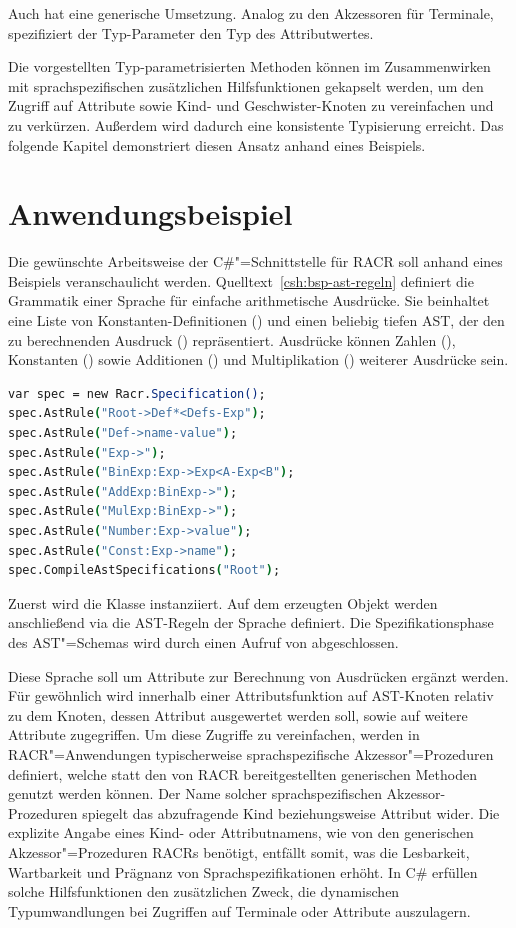 Auch  hat eine generische Umsetzung. Analog zu den Akzessoren für Terminale, spezifiziert der Typ-Parameter den Typ des Attributwertes.

Die vorgestellten Typ-parametrisierten Methoden können im Zusammenwirken mit sprachspezifischen zusätzlichen Hilfsfunktionen gekapselt werden, um den Zugriff auf Attribute sowie Kind- und Geschwister-Knoten zu vereinfachen und zu verkürzen. Außerdem wird dadurch eine konsistente Typisierung erreicht. Das folgende Kapitel demonstriert diesen Ansatz anhand eines Beispiels.

\section{Anwendungsbeispiel}\label{anwendungsbeispiel}

Die gewünschte Arbeitsweise der C\#"=Schnittstelle für RACR soll anhand eines Beispiels veranschaulicht werden. Quelltext~\ref{csh:bsp-ast-regeln} definiert die Grammatik einer Sprache für einfache arithmetische Ausdrücke. Sie beinhaltet eine Liste von Konstanten-Definitionen () und einen beliebig tiefen AST, der den zu berechnenden Ausdruck () repräsentiert. Ausdrücke können Zahlen (), Konstanten () sowie Additionen () und Multiplikation () weiterer Ausdrücke sein.

\begin{lstlisting}[language=csh, caption={Spezifikation von AST-Regeln}, label=csh:bsp-ast-regeln]
var spec = new Racr.Specification();
spec.AstRule("Root->Def*<Defs-Exp");
spec.AstRule("Def->name-value");
spec.AstRule("Exp->");
spec.AstRule("BinExp:Exp->Exp<A-Exp<B");
spec.AstRule("AddExp:BinExp->");
spec.AstRule("MulExp:BinExp->");
spec.AstRule("Number:Exp->value");
spec.AstRule("Const:Exp->name");
spec.CompileAstSpecifications("Root");
\end{lstlisting}

Zuerst wird die Klasse  instanziiert. Auf dem erzeugten Objekt werden anschließend via  die AST-Regeln der Sprache definiert. Die Spezifikationsphase des AST"=Schemas wird durch einen Aufruf von  abgeschlossen.

Diese Sprache soll um Attribute zur Berechnung von Ausdrücken ergänzt werden. Für gewöhnlich wird innerhalb einer Attributsfunktion auf AST-Knoten relativ zu dem Knoten, dessen Attribut ausgewertet werden soll, sowie auf weitere Attribute zugegriffen. Um diese Zugriffe zu vereinfachen, werden in RACR"=Anwendungen typischerweise sprachspezifische Akzessor"=Prozeduren definiert, welche statt den von RACR bereitgestellten generischen Methoden genutzt werden können. Der Name solcher sprachspezifischen Akzessor-Prozeduren spiegelt das abzufragende Kind beziehungsweise Attribut wider. Die explizite Angabe eines Kind- oder Attributnamens, wie von den generischen Akzessor"=Prozeduren RACRs benötigt, entfällt somit, was die Lesbarkeit, Wartbarkeit und Prägnanz von Sprachspezifikationen erhöht. In C\# erfüllen solche Hilfsfunktionen den zusätzlichen Zweck, die dynamischen Typumwandlungen bei Zugriffen auf Terminale oder Attribute auszulagern.

